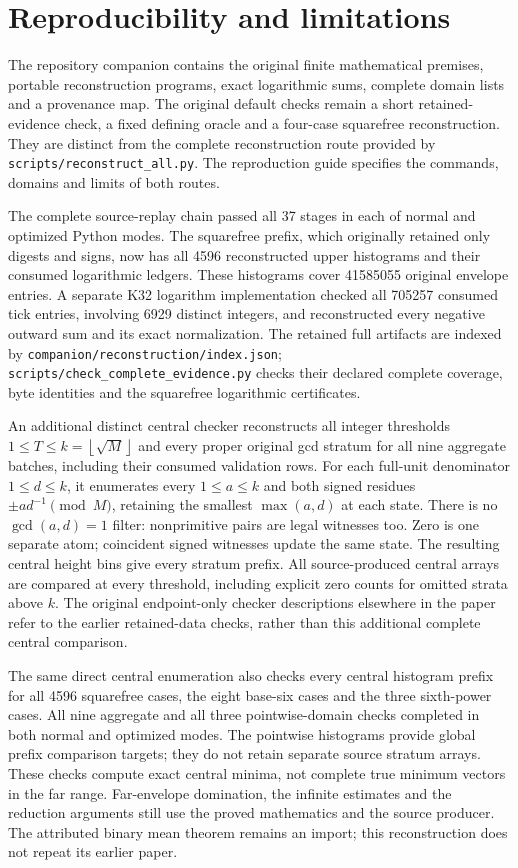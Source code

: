 \documentclass[11pt]{article}
\theoremstyle{definition}\newtheorem{definition}[theorem]{Definition}
\theoremstyle{remark}\newtheorem{remark}[theorem]{Remark}
\newcommand{\floor}[1]{\left\lfloor #1\right\rfloor}
\begin{document}
\section{Reproducibility and limitations}\label{sec:repro}
The repository companion contains the original finite mathematical premises,
portable reconstruction programs, exact logarithmic sums, complete domain
lists and a provenance map. The original default checks remain a short
retained-evidence check, a fixed defining oracle and a four-case squarefree
reconstruction. They are distinct from the complete reconstruction route
provided by \texttt{scripts/reconstruct\_all.py}. The reproduction guide
specifies the commands, domains and limits of both routes.

The complete source-replay chain passed all 37 stages in each of normal
and optimized Python modes. The squarefree prefix, which originally
retained only digests and signs, now has all 4596 reconstructed upper
histograms and their consumed logarithmic ledgers. These histograms cover
41585055 original envelope entries. A separate K32 logarithm implementation
checked all 705257 consumed tick entries, involving 6929 distinct integers,
and reconstructed every negative outward sum and its exact normalization.
The retained full artifacts are indexed by
\texttt{companion/reconstruction/index.json};
\texttt{scripts/check\_complete\_evidence.py} checks their declared complete
coverage, byte identities and the squarefree logarithmic certificates.

An additional distinct central checker reconstructs all integer thresholds
\(1\le T\le k=\floor{\sqrt M}\) and every proper original gcd stratum
for all nine aggregate batches, including their consumed validation rows.
For each full-unit denominator \(1\le d\le k\), it enumerates every
\(1\le a\le k\) and both signed residues \(\pm ad^{-1}\pmod M\),
retaining the smallest \(\max(a,d)\) at each state. There is no
\(\gcd(a,d)=1\) filter: nonprimitive pairs are legal witnesses too.
Zero is one separate atom; coincident signed witnesses update the same
state. The resulting central height bins give every stratum prefix.
All source-produced central arrays are compared at every threshold,
including explicit zero counts for omitted strata above \(k\).
The original endpoint-only checker descriptions elsewhere in the paper
refer to the earlier retained-data checks, rather than this additional
complete central comparison.

The same direct central enumeration also checks every central histogram
prefix for all 4596 squarefree cases, the eight base-six cases and the
three sixth-power cases. All nine aggregate and all three pointwise-domain
checks completed in both normal and optimized modes. The pointwise
histograms provide global prefix comparison targets; they do not retain
separate source stratum arrays. These checks compute exact central minima,
not complete true minimum vectors in the far range. Far-envelope domination,
the infinite estimates and the reduction arguments still use the proved
mathematics and the source producer. The attributed binary mean theorem
remains an import; this reconstruction does not repeat its earlier paper.
\end{document}
